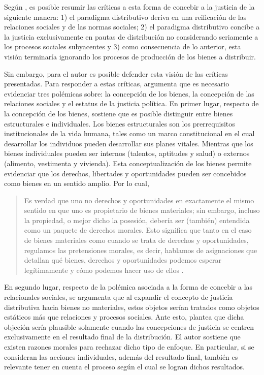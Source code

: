 Según \citet[p. 49]{Gosepath_2013}, es posible resumir las críticas a esta forma de concebir a la justicia de la siguiente manera: 1) el paradigma distributivo deriva en una reificación de las relaciones sociales y de las normas sociales; 2) el paradigma distributivo concibe a la justicia exclusivamente en pautas de distribución no considerando seriamente a los procesos sociales subyacentes y 3) como consecuencia de lo anterior, esta visión terminaría ignorando los procesos de producción de los bienes a distribuir.

Sin embargo, para el autor es posible defender esta visión de las críticas presentadas. Para responder a estas críticas, \citet{Gosepath_2013} argumenta que es necesario evidenciar tres polémicas sobre: la concepción de los bienes, la concepción de las relaciones sociales y el estatus de la justicia política. En primer lugar, respecto de la concepción de los bienes, \citet{Gosepath_2013} sostiene que es posible distinguir entre bienes estructurales e individuales. Los bienes estructurales son los prerrequisitos institucionales de la vida humana, tales como un marco constitucional en el cual desarrollar los individuos pueden desarrollar sus planes vitales. Mientras que los bienes individuales pueden ser internos (talentos, aptitudes y salud) o externos (alimento, vestimenta y vivienda). Esta conceptualización de los bienes permite evidenciar que los derechos, libertades y oportunidades pueden ser concebidos como bienes en un sentido amplio. Por lo cual,

\vspace{3mm}
\begin{quote}
    Es verdad que uno no  derechos y oportunidades en exactamente el mismo sentido en que uno es propietario de bienes materiales; sin embargo, incluso la propiedad, o mejor dicho la posesión, debería ser (también) entendida como un paquete de derechos morales. Esto significa que tanto en el caso de bienes materiales como cuando se trata de derechos y oportunidades, regulamos las pretensiones morales, es decir, hablamos de asignaciones que detallan qué bienes, derechos y oportunidades podemos esperar legítimamente y cómo podemos hacer uso de ellos \citep[p. 51]{Gosepath_2013}.
\end{quote}
\vspace{3mm}

En segundo lugar, respecto de la polémica asociada a la forma de concebir a las relacionales sociales, se argumenta que al expandir el concepto de justicia distributiva hacia bienes no materiales, estos objetos serían tratados como objetos estáticos más que relaciones y procesos sociales. Ante esto, \citet{Gosepath_2013} plantea que dicha objeción sería plausible solamente cuando las concepciones de justicia se centren exclusivamente en el resultado final de la distribución. El autor sostiene que existen razones morales para rechazar dicho tipo de enfoque. En particular, si se consideran las acciones individuales, además del resultado final, también es relevante tener en cuenta el proceso según el cual se logran dichos resultados.

